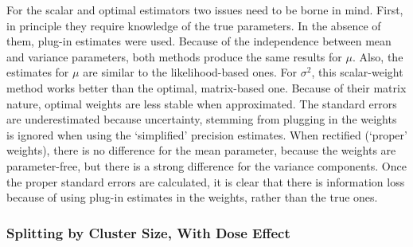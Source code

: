\documentclass[11pt,a5paper,twoside]{book}
\begin{document}
For the scalar and optimal estimators two issues need to be 
borne in mind. First, in principle they require knowledge of 
the true parameters. In the absence of them, plug-in estimates 
were used. Because of the independence between mean and 
variance parameters, both methods produce the same results 
for $\mu$. Also, the estimates for $\mu$ are similar to the 
likelihood-based ones. For $\sigma^2$, this scalar-weight 
method works better than the optimal, matrix-based one. 
Because 
of their matrix nature, optimal weights are less stable when approximated. 
The standard errors are underestimated because uncertainty, 
stemming from plugging in the weights is ignored when 
using the `simplified' precision estimates. When rectified 
(`proper' weights), there is no difference for the mean parameter, 
because the weights are parameter-free, but there is a strong 
difference for the variance components. Once the proper standard 
errors are calculated, it is clear that there is information 
loss because of using plug-in estimates in the weights, 
rather than the true ones.

\subsubsection{Splitting by Cluster Size, With Dose Effect}
\label{withdose}
\end{document}
